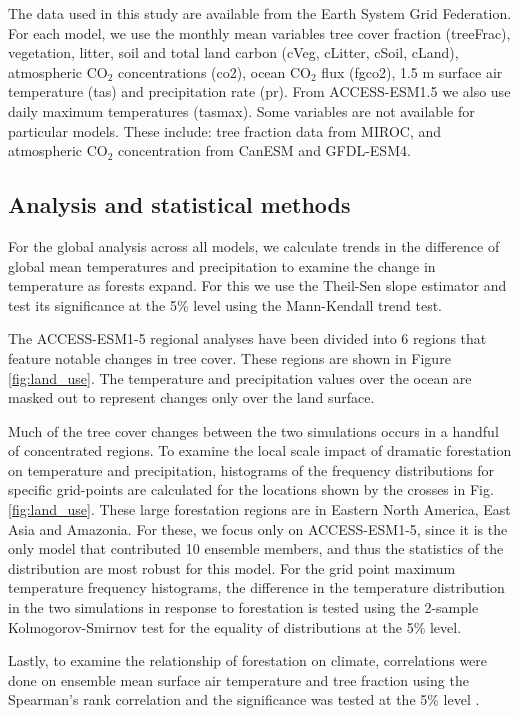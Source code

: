 \documentclass[]{article}
\begin{document}
The data used in this study are available from the Earth System Grid Federation.
For each model, we use the monthly mean variables tree cover fraction (treeFrac), vegetation, litter, soil and total land carbon (cVeg, cLitter, cSoil, cLand), atmospheric CO$_2$ concentrations (co2), ocean CO$_2$ flux (fgco2), 1.5 m surface air temperature (tas) and precipitation rate (pr).
From ACCESS-ESM1.5 we also use daily maximum temperatures (tasmax).
Some variables are not available for particular models. These include: tree fraction data from MIROC, and atmospheric CO$_2$ concentration from CanESM and GFDL-ESM4.

\subsection{Analysis and statistical methods}

For the global analysis across all models, we calculate trends in the difference of global mean temperatures and precipitation to examine the change in temperature as forests expand.
For this we use the Theil-Sen slope estimator and test its significance at the 5\% level using the Mann-Kendall trend test.

The ACCESS-ESM1-5 regional analyses have been divided into 6 regions that feature notable changes in tree cover.
These regions are shown in Figure \ref{fig:land_use}.
The temperature and precipitation values over the ocean are masked out to represent changes only over the land surface.

Much of the tree cover changes between the two simulations occurs in a handful of concentrated regions.
To examine the local scale impact of dramatic forestation on temperature and precipitation, histograms of the frequency distributions for specific grid-points are calculated for the locations shown by the crosses in Fig. \ref{fig:land_use}.
These large forestation regions are in Eastern North America, East Asia and Amazonia.
For these, we focus only on ACCESS-ESM1-5, since it is the only model that contributed 10 ensemble members, and thus the statistics of the distribution are most robust for this model.
For the grid point maximum temperature frequency histograms, the difference in the temperature distribution in the two simulations in response to forestation is tested using the 2-sample Kolmogorov-Smirnov test for the equality of distributions at the 5\% level.

Lastly, to examine the relationship of forestation on climate, correlations were done on ensemble mean surface air temperature and tree fraction using the Spearman's rank correlation and the significance was tested at the 5\% level \parencite{kokoska2000crc}.
\end{document}
